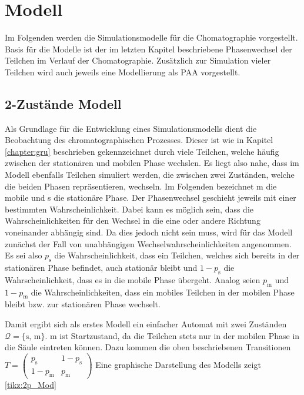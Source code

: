 \chapter{Modell} %
\label{chapter:mod}
Im Folgenden werden die Simulationsmodelle für die Chomatographie vorgestellt. Basis für die Modelle ist der im letzten Kapitel beschriebene Phasenwechsel der Teilchen im Verlauf der Chomatographie. Zusätzlich zur Simulation vieler Teilchen wird auch jeweils eine Modellierung als PAA vorgestellt.


\section{2-Zustände Modell}
\label{chapter:mod:2p}

Als Grundlage für die Entwicklung eines Simulationsmodells dient die Beobachtung des chromatographischen Prozesses. Dieser ist wie in Kapitel \ref{chapter:gru} beschrieben gekennzeichnet durch viele Teilchen, welche häufig zwischen der stationären und mobilen Phase wechslen. Es liegt also nahe, dass im Modell ebenfalls Teilchen simuliert werden, die zwischen zwei Zuständen, welche die beiden Phasen repräsentieren, wechseln. Im Folgenden bezeichnet m die mobile und s die stationäre Phase. Der Phasenwechsel geschieht jeweils mit einer bestimmten Wahrscheinlichkeit. Dabei kann es möglich sein, dass die Wahrscheinlichkeiten für den Wechsel in die eine oder andere Richtung voneinander abhängig sind. Da dies jedoch nicht sein muss, wird für das Modell zunächst der Fall von unabhängigen Wechselwahrscheinlichkeiten angenommen. Es sei also $p_{\text {s}}$ die Wahrscheinlichkeit, dass ein Teilchen, welches sich bereits in der stationären Phase befindet, auch stationär bleibt und $1-p_{\text {s}}$ die Wahrscheinlichkeit, dass es in die mobile Phase übergeht. Analog seien $p_{\text {m}}$ und $1-p_{\text {m}}$ die Wahrscheinlichkeiten, dass ein mobiles Teilchen in der mobilen Phase bleibt bzw. zur stationären Phase wechselt. 

Damit ergibt sich als erstes Modell ein einfacher Automat mit zwei Zuständen $\mathcal{Q} = \{\text{s, m}\}$. m ist Startzustand, da die Teilchen stets nur in der mobilen Phase in die Säule eintreten können. Dazu kommen die oben beschriebenen Transitionen $T= 
\begin{pmatrix}
p_{\text {s}} & 1-p_{\text {s}} \\
1-p_{\text {m}} & p_{\text {m}} 
\end{pmatrix}
$ 
Eine graphische Darstellung des Modells zeigt \ref{tikz:2p_Mod} 

